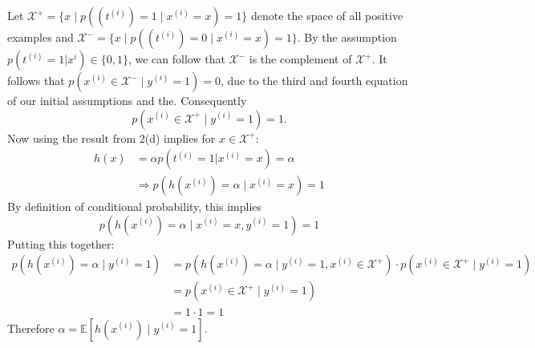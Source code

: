 \begin{answer}
Let $\mathcal{X}^+=\{x \mid p((t^{(i)})=1 \mid x^{(i)} = x) = 1 \}$ denote the space of all positive examples and $\mathcal{X}^-=\{x \mid p((t^{(i)})=0 \mid x^{(i)} = x) = 1 \}$.
By the assumption $p(t^{(i)}=1| x^{i})\in\{0,1\}$, we can follow that $\mathcal{X}^-$ is the complement of $\mathcal{X^+}$.
It follows that $p(x^{(i)}\in \mathcal{X}^- \mid y^{(i)}=1)= 0$, due to the third and fourth equation of our initial assumptions and the.
Consequently
\begin{equation}
    p(x^{(i)}\in \mathcal{X}^+ \mid y^{(i)}=1)= 1.
\end{equation}
Now using the result from 2(d) implies for $x\in\mathcal{X}^+$:
\begin{align*}
    h(x) &= \alpha p(t^{(i)}=1| x^{(i)}=x) = \alpha  \\
    &\Rightarrow p(h(x^{(i)})=\alpha \mid x^{(i)}=x) = 1
\end{align*}
By definition of conditional probability, this implies
\begin{equation*}
    p(h(x^{(i)})=\alpha \mid x^{(i)}=x, y^{(i)}=1) = 1
\end{equation*}
Putting this together:
\begin{align*} 
    p(h(x^{(i)}) =\alpha \mid y^{(i)}=1) &= p(h(x^{(i)})=\alpha \mid y^{(i)}=1, x^{(i)}\in \mathcal{X}^+)\cdot p(x^{(i)}\in \mathcal{X}^+ \mid y^{(i)}=1) \\
                 &= p(x^{(i)}\in \mathcal{X}^+ \mid y^{(i)}=1) \\
                 &= 1 \cdot 1 = 1
\end{align*}
Therefore $\alpha = \mathbb{E}[h(x^{(i)})\mid y^{(i)}=1]$.
\end{answer}
